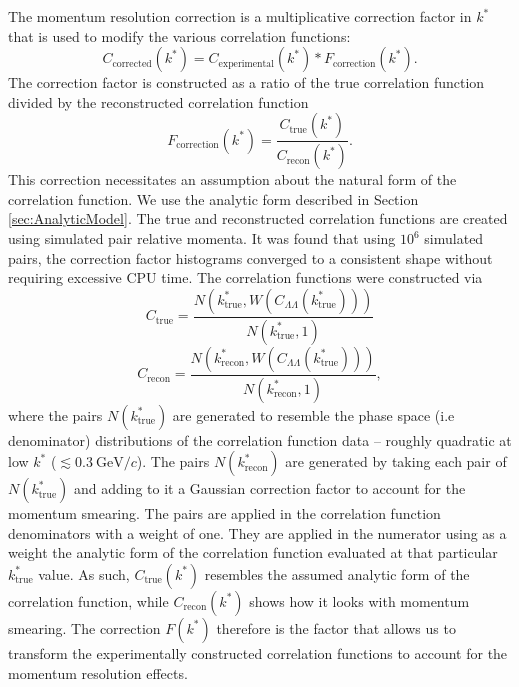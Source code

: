 The momentum resolution correction is a multiplicative correction factor in $k^*$ that is used to modify the various correlation functions:
\begin{equation}
C_\mathrm{corrected}(k^*) = C_{\mathrm{experimental}}(k^*)*F_\mathrm{correction}(k^*).
\end{equation}
The correction factor is constructed as a ratio of the true correlation function divided by the reconstructed correlation function
\begin{equation}
F_\mathrm{correction}(k^*)=\frac{C_\mathrm{true}(k^*)}{C_\mathrm{recon}(k^*)}.
\end{equation}
This correction necessitates an assumption about the natural form of the correlation function.  We use the analytic form described in Section \ref{sec:AnalyticModel}.  The true and reconstructed correlation functions are created using simulated pair relative momenta.  It was found that using $10^6$ simulated pairs, the correction factor histograms converged to a consistent shape without requiring excessive CPU time.  The correlation functions were constructed via
\begin{equation}
\label{eq:Ctrue}
C_{\mathrm{true}} = \frac{ N(k^*_{\mathrm{true}},W(C_{\Lambda\Lambda}(k^*_{\mathrm{true}})))}{N(k^*_{\mathrm{true}},1)}
\end{equation}
\begin{equation}
\label{eq:Crecon}
C_{\mathrm{recon}} = \frac{ N(k^*_{\mathrm{recon}},W(C_{\Lambda\Lambda}(k^*_{\mathrm{true}})))}{N(k^*_{\mathrm{recon}},1)},
\end{equation}
where the pairs $N(k^*_\mathrm{true})$ are generated to resemble the phase space (i.e denominator) distributions of the correlation function data -- roughly quadratic at low $k^*$ ($\lesssim 0.3 \ \mathrm{GeV}/c$).  The pairs $N(k^*_\mathrm{recon})$ are generated by taking each pair of $N(k^*_\mathrm{true})$ and adding to it a Gaussian correction factor to account for the momentum smearing.  The pairs are applied in the correlation function denominators with a weight of one.  They are applied in the numerator using as a weight the analytic form of the correlation function evaluated at that particular $k^*_{\mathrm{true}}$ value.  As such, $C_{\mathrm{true}}(k^*)$ resembles the assumed analytic form of the correlation function, while $C_{\mathrm{recon}}(k^*)$ shows how it looks with momentum smearing.  The correction $F(k^*)$ therefore is the factor that allows us to transform the experimentally constructed correlation functions to account for the momentum resolution effects.

